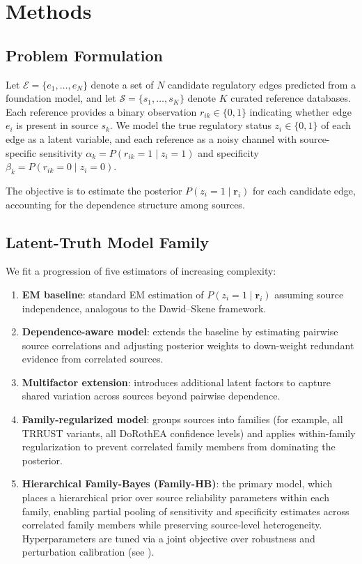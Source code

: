 \documentclass[11pt,a4paper]{article}
\begin{document}
\section{Methods}\label{sec:methods}

\subsection{Problem Formulation}\label{sec:problem}

Let $\mathcal{E} = \{e_1, \ldots, e_N\}$ denote a set of $N$ candidate regulatory edges predicted from a foundation model, and let $\mathcal{S} = \{s_1, \ldots, s_K\}$ denote $K$ curated reference databases.
Each reference provides a binary observation $r_{ik} \in \{0, 1\}$ indicating whether edge $e_i$ is present in source $s_k$.
We model the true regulatory status $z_i \in \{0, 1\}$ of each edge as a latent variable, and each reference as a noisy channel with source-specific sensitivity $\alpha_k = P(r_{ik}=1 \mid z_i=1)$ and specificity $\beta_k = P(r_{ik}=0 \mid z_i=0)$.

The objective is to estimate the posterior $P(z_i = 1 \mid \mathbf{r}_i)$ for each candidate edge, accounting for the dependence structure among sources.

\subsection{Latent-Truth Model Family}\label{sec:models}

We fit a progression of five estimators of increasing complexity:

\begin{enumerate}
  \item \textbf{EM baseline}: standard EM estimation of $P(z_i = 1 \mid \mathbf{r}_i)$ assuming source independence, analogous to the Dawid--Skene framework.
  \item \textbf{Dependence-aware model}: extends the baseline by estimating pairwise source correlations and adjusting posterior weights to down-weight redundant evidence from correlated sources.
  \item \textbf{Multifactor extension}: introduces additional latent factors to capture shared variation across sources beyond pairwise dependence.
  \item \textbf{Family-regularized model}: groups sources into families (for example, all TRRUST variants, all DoRothEA confidence levels) and applies within-family regularization to prevent correlated family members from dominating the posterior.
  \item \textbf{Hierarchical Family-Bayes (Family-HB)}: the primary model, which places a hierarchical prior over source reliability parameters within each family, enabling partial pooling of sensitivity and specificity estimates across correlated family members while preserving source-level heterogeneity. Hyperparameters are tuned via a joint objective over robustness and perturbation calibration (see ).
\end{enumerate}
\end{document}
